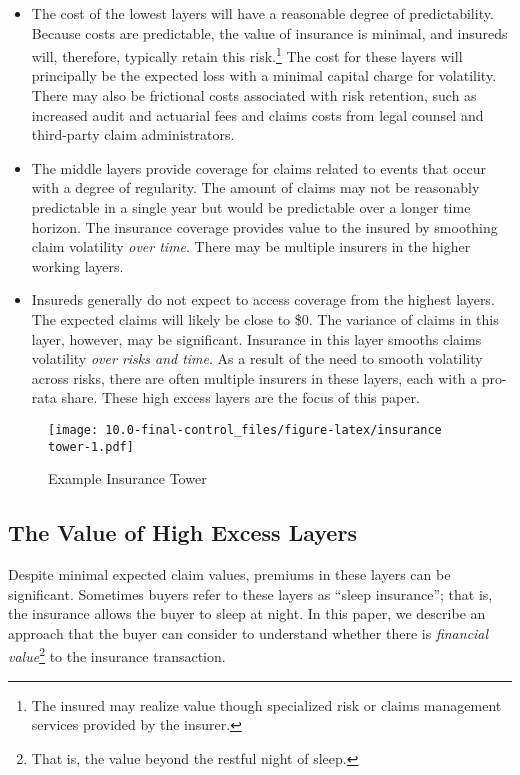 \documentclass[
]{article}
\begin{document}
\begin{itemize}
\item
  The cost of the lowest layers will have a reasonable degree of
  predictability. Because costs are predictable, the value of insurance
  is minimal, and insureds will, therefore, typically retain this
  risk.\footnote{The insured may realize value though specialized risk
    or claims management services provided by the insurer.} The cost for
  these layers will principally be the expected loss with a minimal
  capital charge for volatility. There may also be frictional costs
  associated with risk retention, such as increased audit and actuarial
  fees and claims costs from legal counsel and third-party claim
  administrators.
\item
  The middle layers provide coverage for claims related to events that
  occur with a degree of regularity. The amount of claims may not be
  reasonably predictable in a single year but would be predictable over
  a longer time horizon. The insurance coverage provides value to the
  insured by smoothing claim volatility \emph{over time}. There may be
  multiple insurers in the higher working layers.
\item
  Insureds generally do not expect to access coverage from the highest
  layers. The expected claims will likely be close to \$0. The variance
  of claims in this layer, however, may be significant. Insurance in
  this layer smooths claims volatility \emph{over risks and time}. As a
  result of the need to smooth volatility across risks, there are often
  multiple insurers in these layers, each with a pro-rata share. These
  high excess layers are the focus of this paper.
\end{itemize}

\begin{figure}
\centering
\texttt{[image: 10.0-final-control\_files/figure-latex/insurance tower-1.pdf]}
\caption{\label{fig:tower}Example Insurance Tower}
\end{figure}

\hypertarget{the-value-of-high-excess-layers}{%
\subsection{The Value of High Excess
Layers}\label{the-value-of-high-excess-layers}}

Despite minimal expected claim values, premiums in these layers can be
significant. Sometimes buyers refer to these layers as ``sleep
insurance''; that is, the insurance allows the buyer to sleep at night.
In this paper, we describe an approach that the buyer can consider to
understand whether there is \emph{financial value}\footnote{That is, the
  value beyond the restful night of sleep.} to the insurance
transaction.
\end{document}
